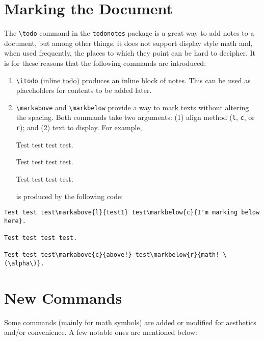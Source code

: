\documentclass[10pt,oneside,letterpaper]{amsart}
\begin{document}
\section{Marking the Document}
\label{sec:marking}
The \verb|\todo| command in the \verb|todonotes| package is a great way to add notes to a document, but among other things, it does not support display style math and, when used frequently, the places to which they point can be hard to decipher. 
It is for these reasons that the following commands are introduced:
\begin{enumerate}[label=(\alph*)]
  \item \verb|\itodo| (\underline{i}nline \underline{todo}) produces an inline block of notes. 
    This can be used as placeholders for contents to be added later. 
  \item \verb|\markabove| and \verb|\markbelow| provide a way to mark texts without altering the spacing. 
  Both commands take two arguments: (1) align method (\verb|l|, \verb|c|, or \verb|r|); and (2) text to display. 
  For example, 

  \begin{mdframed}
    \noindent
    Test test test test.

    \noindent
    Test test test test.

    \noindent
    Test test test test.
  \end{mdframed}
  is produced by the following code:
\end{enumerate}
\begin{verbatim}
Test test test\markabove{l}{test1} test\markbelow{c}{I'm marking below here}.

Test test test test.

Test test test\markabove{c}{above!} test\markbelow{r}{math! \(\alpha\)}.
\end{verbatim}




\section{New Commands}
Some commands (mainly for math symbols) are added or modified for aesthetics and/or convenience.
A few notable ones are mentioned below:
\end{document}
